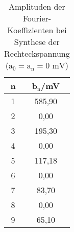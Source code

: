 \begin{table}[h]
	\begin{center}
		\begin{tabular}{cc}
			n&b$_\text{n}$/mV \\ \hline
			1&585,90\\
			2&0,00\\
			3&195,30\\
			4&0,00\\
			5&117,18\\
			6&0,00\\
			7&83,70\\
			8&0,00\\
			9&65,10
		\end{tabular}
		\caption{Amplituden der Fourier-Koeffizienten bei Synthese der Rechteckspannung (a$_\text{0}=\text{a}_\text{n}=0\text{ mV}$)}
		\label{tabfsr}
	\end{center}
\end{table}